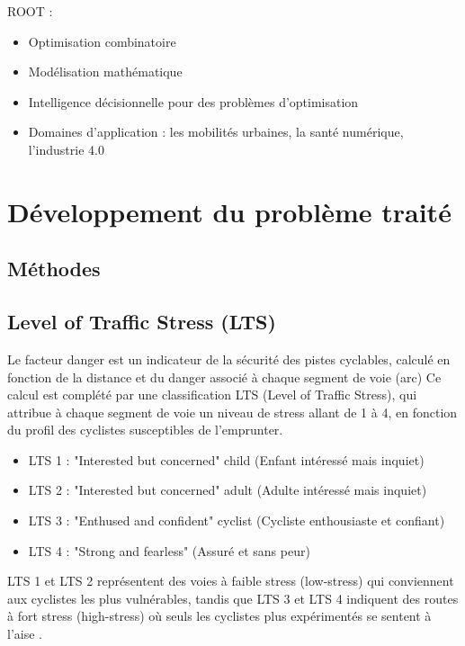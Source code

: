 \documentclass[a4paper,12pt,twoside,french]{article}
\begin{document}
ROOT :
\begin{itemize}
    \item Optimisation combinatoire
    \item Modélisation mathématique
    \item Intelligence décisionnelle pour des problèmes d'optimisation
    \item Domaines d'application : les mobilités urbaines, la santé numérique, l'industrie 4.0
\end{itemize}

\section{Développement du problème traité}

\subsection{Méthodes}

\subsection{Level of Traffic Stress (LTS)}

Le facteur danger est un indicateur de la sécurité des pistes cyclables, calculé en fonction de la distance et du danger associé à chaque segment de voie (arc) Ce calcul est complété
par une classification LTS (Level of Traffic Stress), qui attribue à chaque segment de voie un
niveau de stress allant de 1 à 4, en fonction du profil des cyclistes susceptibles de l’emprunter.

\begin{itemize}
    \item LTS 1 : "Interested but concerned" child (Enfant intéressé mais inquiet)
    \item LTS 2 : "Interested but concerned" adult (Adulte intéressé mais inquiet)
    \item LTS 3 : "Enthused and confident" cyclist (Cycliste enthousiaste et confiant)
    \item LTS 4 : "Strong and fearless" (Assuré et sans peur)
\end{itemize}

LTS 1 et LTS 2 représentent des voies à faible stress (low-stress) qui conviennent aux
cyclistes les plus vulnérables, tandis que LTS 3 et LTS 4 indiquent des routes à fort stress
(high-stress) où seuls les cyclistes plus expérimentés se sentent à l’aise \cite{kent_karner}.
\end{document}
